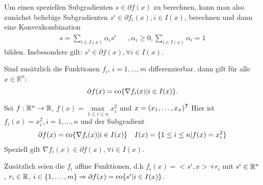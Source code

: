 Um einen speziellen Subgradienten $s\in\partial f(x)$ zu berechnen, kann man also zunächst beliebige Subgradienten 
$s^i\in\partial f_i(x), i \in I(x)$, berechnen und dann eine Konvexkombination
\begin{align}
 s = \sum\limits_{i\in I(x)} \alpha_i s^i & & ,\alpha_i\geq 0, \sum\limits_{i\in I(x)} \alpha_i = 1
\end{align}
bilden. Insbesondere gilt: $s^i\in \partial f(x), \forall i \in I(x)$.

\begin{Korollar}
 Sind zusätzlich die Funktionen $f_i$, $i=1,\dots,m$ differenzierbar. dann gilt für alle $x\in\mathbb{R}^n$:
 \begin{equation}
  \partial f(x) = \operatorname{co}\{\nabla f_i(x)|i\in I(x)\}.
 \end{equation}
\end{Korollar}

\begin{Beispiel}
 Sei $f:\mathbb R^n\rightarrow\mathbb R$, $f(x) = \max\limits_{1\leq i\leq n} x_i^2$ und $x = (x_1,\dots,x_n)^\mathsf{T}$
 Hier ist $f_i(x) = x_i^2, i=1,\dots,n$ und der Subgradient
 \begin{align}
  \partial f(x) = \operatorname{co}\{\nabla f_i(x)|i\in I(x)\} & & I(x) = \{1\leq i \leq n|f(x) = x_i^2\}
 \end{align}
Speziell gilt $\nabla f_i(x) \in \partial f(x), \forall i \in I(x)$.
\end{Beispiel}

\begin{Korollar}\label{kor:affin:nonsmooth}
 Zusätzlich seien die $f_i$ affine Funktionen, d.h $f_i(x) = <s^i,x> + r_i$ mit $s^i\in\mathbb R^n$, $r_i\in\mathbb R$, 
$i\in\{1,\dots,m\}\Rightarrow \partial f(x) = \operatorname{co}\{s^i|i\in I(x)\}$.
\end{Korollar}


